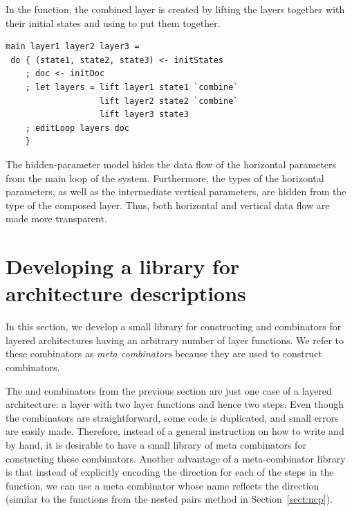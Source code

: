 \documentclass[preprint,natbib]{sigplanconf}
\begin{document}
In the  function, the combined layer is created by lifting the layers together with their initial states and using  to put them together.

\begin{small}
\begin{verbatim}
main layer1 layer2 layer3 =
 do { (state1, state2, state3) <- initStates
    ; doc <- initDoc 
    ; let layers = lift layer1 state1 `combine` 
                   lift layer2 state2 `combine`
                   lift layer3 state3
    ; editLoop layers doc
    }
\end{verbatim}
\end{small}


The hidden-parameter model hides the data flow of the horizontal parameters from the main loop of the system. Furthermore, the types of the horizontal parameters, as well as the intermediate vertical parameters, are hidden from the type of the composed layer. Thus, both horizontal and vertical data flow are made more transparent. 



%																
%																
%																
\section{Developing a library for architecture descriptions} \label{sect:lib}

In this section, we develop a small library for constructing  and  combinators for layered architectures having an arbitrary number of layer functions. We refer to these combinators as {\em meta combinators} because they are used to construct combinators.

The  and  combinators from the previous section are just one case of a layered architecture: a layer with two layer functions and hence two steps. Even though the combinators are straightforward, some code is duplicated, and small errors are easily made. Therefore, instead of a general instruction on how to write  and  by hand, it is desirable to have a small library of meta combinators for constucting these combinators. Another advantage of a meta-combinator library is that instead of explicitly encoding the direction for each of the steps in the  function, we can use a meta combinator whose name reflects the direction (similar to the  functions from the nested pairs method in Section~\ref{sect:ncp}).
\end{document}
